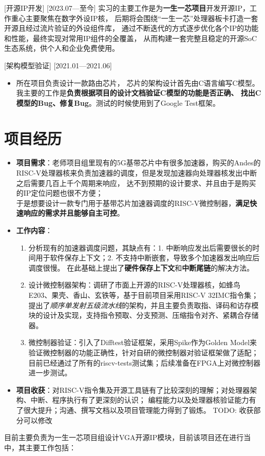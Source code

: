 \documentclass{resume}
\begin{document}
[开源IP开发]
[2023.07—至今] 
实习的主要工作是为\textbf{一生一芯项目}开发开源IP，工作重心主要聚焦在数字外设IP核，
后期将会围绕“一生一芯”处理器板卡打造一套开源且经过流片验证的外设组件库，
通过不断迭代的方式逐步优化各个IP的功能和性能，最终实现对常用IP组件的全覆盖，
从而构建一套完整且稳定的开源SoC生态系统，供个人和企业免费使用。

[架构模型验证]
[2021.01—2021.06] 
\begin{itemize}
  \item 所在项目负责设计一款路由芯片，
      芯片的架构设计首先由C语言编写C模型。
      我主要的工作是\textbf{负责根据项目的设计文档验证C模型的功能是否正确、
      找出C模型的Bug、修复Bug}。测试的时候使用到了Google Test框架。
\end{itemize}

\section{项目经历}
\begin{itemize}
    \item \textbf{项目需求}：老师项目组里现有的5G基带芯片中有很多加速器，购买的Andes的RISC-V处理器核来负责加速器的调度，但是发现加速器向处理器核发出中断之后需要几百上千个周期来响应，
    达不到预期的设计要求、并且由于是购买的IP定位问题也很不方便；\\
    于是想要设计一款专门用于基带芯片加速器调度的RISC-V微控制器，\textbf{满足快速响应的需求并且能够自主可控}。
    \item \textbf{工作内容}：
    \begin{enumerate}
        \item 分析现有的加速器调度问题，其缺点有：1. 中断响应发出后需要很长的时间用于软件保存上下文；2. 不支持中断嵌套，导致多个加速器发出响应后调度很慢。
              在此基础上提出了\textbf{硬件保存上下文}和\textbf{中断尾链}的解决方法。
        \item 设计微控制器架构：调研了市面上开源的RISC-V处理器核，如蜂鸟E203、果壳、香山、玄铁等，基于目前项目采用RISC-V 32IMC指令集；
              提出了\textit{顺序单发射五级流水线}的架构，并且主要负责取指、译码和访存模块的设计及实现，支持指令预取、分支预测、压缩指令对齐、紧耦合存储器。
        \item 微控制器验证：引入了Difftest验证框架，采用Spike作为Golden Model来验证微控制器的功能正确性，针对自研的微控制器对验证框架做了适配；
              目前已经通过了所有的riscv-tests测试集；后续准备在FPGA上对微控制器进一步测试。
    \end{enumerate}
    \item \textbf{项目收获}：对RISC-V指令集及开源工具链有了比较深刻的理解；对处理器架构、中断、程序执行有了更深刻的认识；
          编程能力以及处理器核验证能力有了很大提升；沟通、撰写文档以及项目管理能力得到了锻炼。
          TODO: 收获部分可以修改
\end{itemize}
目前主要负责为一生一芯项目组设计VGA开源IP模块，目前该项目还在进行当中，其主要工作包括：
\end{document}
